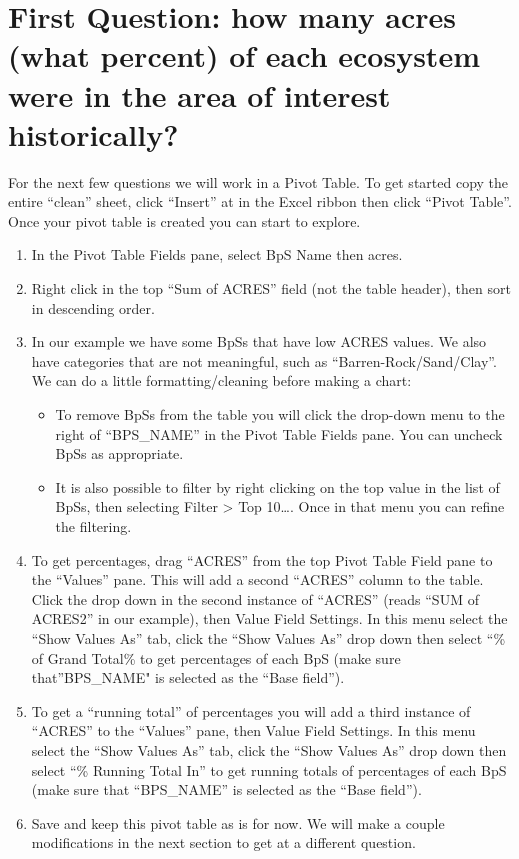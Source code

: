 \documentclass[
]{book}
\providecommand{\tightlist}{%
  \setlength{\itemsep}{0pt}\setlength{\parskip}{0pt}}
\begin{document}
\hypertarget{first-question-how-many-acres-what-percent-of-each-ecosystem-were-in-the-area-of-interest-historically}{%
\section{First Question: how many acres (what percent) of each ecosystem were in the area of interest historically?}\label{first-question-how-many-acres-what-percent-of-each-ecosystem-were-in-the-area-of-interest-historically}}

For the next few questions we will work in a Pivot Table. To get started copy the entire ``clean'' sheet, click ``Insert'' at in the Excel ribbon then click ``Pivot Table''. Once your pivot table is created you can start to explore.

\begin{enumerate}
\def\labelenumi{\arabic{enumi}.}
\tightlist
\item
  In the Pivot Table Fields pane, select BpS Name then acres.\\
\item
  Right click in the top ``Sum of ACRES'' field (not the table header), then sort in descending order.
\item
  In our example we have some BpSs that have low ACRES values. We also have categories that are not meaningful, such as ``Barren-Rock/Sand/Clay''. We can do a little formatting/cleaning before making a chart:

  \begin{itemize}
  \tightlist
  \item
    To remove BpSs from the table you will click the drop-down menu to the right of ``BPS\_NAME'' in the Pivot Table Fields pane. You can uncheck BpSs as appropriate.
  \item
    It is also possible to filter by right clicking on the top value in the list of BpSs, then selecting Filter \textgreater{} Top 10\ldots. Once in that menu you can refine the filtering.
  \end{itemize}
\item
  To get percentages, drag ``ACRES'' from the top Pivot Table Field pane to the ``Values'' pane. This will add a second ``ACRES'' column to the table. Click the drop down in the second instance of ``ACRES'' (reads ``SUM of ACRES2'' in our example), then Value Field Settings. In this menu select the ``Show Values As'' tab, click the ``Show Values As'' drop down then select ``\% of Grand Total\% to get percentages of each BpS (make sure that''BPS\_NAME" is selected as the ``Base field'').\\
\item
  To get a ``running total'' of percentages you will add a third instance of ``ACRES'' to the ``Values'' pane, then Value Field Settings. In this menu select the ``Show Values As'' tab, click the ``Show Values As'' drop down then select ``\% Running Total In'' to get running totals of percentages of each BpS (make sure that ``BPS\_NAME'' is selected as the ``Base field'').
\item
  Save and keep this pivot table as is for now. We will make a couple modifications in the next section to get at a different question.
\end{enumerate}
\end{document}
